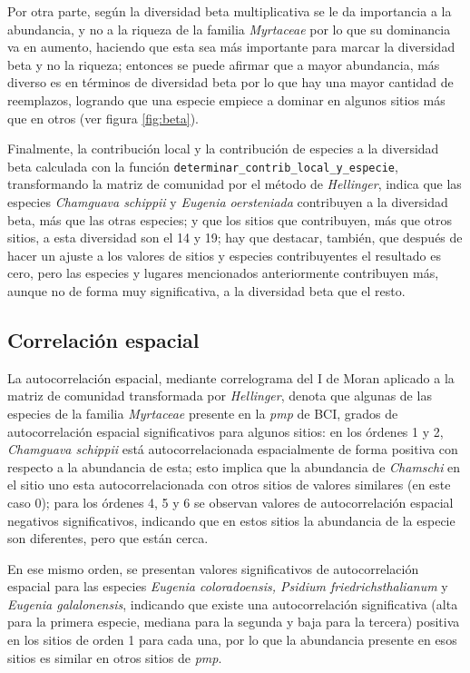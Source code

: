 \documentclass[11pt,]{article}
\begin{document}
Por otra parte, según la diversidad beta multiplicativa se le da
importancia a la abundancia, y no a la riqueza de la familia
\emph{Myrtaceae} por lo que su dominancia va en aumento, haciendo que
esta sea más importante para marcar la diversidad beta y no la riqueza;
entonces se puede afirmar que a mayor abundancia, más diverso es en
términos de diversidad beta por lo que hay una mayor cantidad de
reemplazos, logrando que una especie empiece a dominar en algunos sitios
más que en otros (ver figura \ref{fig:beta}).

Finalmente, la contribución local y la contribución de especies a la
diversidad beta calculada con la función
\texttt{determinar\_contrib\_local\_y\_especie}, transformando la matriz
de comunidad por el método de \emph{Hellinger}, indica que las especies
\emph{Chamguava schippii} y \emph{Eugenia oersteniada} contribuyen a la
diversidad beta, más que las otras especies; y que los sitios que
contribuyen, más que otros sitios, a esta diversidad son el 14 y 19; hay
que destacar, también, que después de hacer un ajuste a los valores de
sitios y especies contribuyentes el resultado es cero, pero las especies
y lugares mencionados anteriormente contribuyen más, aunque no de forma
muy significativa, a la diversidad beta que el resto.

\subsection{Correlación espacial}\label{correlaciuxf3n-espacial}

La autocorrelación espacial, mediante correlograma del I de Moran
aplicado a la matriz de comunidad transformada por \emph{Hellinger},
denota que algunas de las especies de la familia \emph{Myrtaceae}
presente en la \emph{pmp} de BCI, grados de autocorrelación espacial
significativos para algunos sitios: en los órdenes 1 y 2,
\emph{Chamguava schippii} está autocorrelacionada espacialmente de forma
positiva con respecto a la abundancia de esta; esto implica que la
abundancia de \emph{Chamschi} en el sitio uno esta autocorrelacionada
con otros sitios de valores similares (en este caso 0); para los órdenes
4, 5 y 6 se observan valores de autocorrelación espacial negativos
significativos, indicando que en estos sitios la abundancia de la
especie son diferentes, pero que están cerca.

En ese mismo orden, se presentan valores significativos de
autocorrelación espacial para las especies \emph{Eugenia coloradoensis,
Psidium friedrichsthalianum} y \emph{Eugenia galalonensis}, indicando
que existe una autocorrelación significativa (alta para la primera
especie, mediana para la segunda y baja para la tercera) positiva en los
sitios de orden 1 para cada una, por lo que la abundancia presente en
esos sitios es similar en otros sitios de \emph{pmp}.
\end{document}
